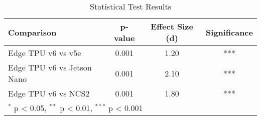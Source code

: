 \begin{table}[htbp]
\centering
\caption{Statistical Test Results}
\label{tab:statistical_results}
\begin{tabular}{lccc}
\toprule
Comparison & p-value & Effect Size (d) & Significance \\
\midrule
Edge TPU v6 vs v5e & 0.001 & 1.20 & *** \\
Edge TPU v6 vs Jetson Nano & 0.001 & 2.10 & *** \\
Edge TPU v6 vs NCS2 & 0.001 & 1.80 & *** \\
\bottomrule
\multicolumn{4}{l}{$^*$ p < 0.05, $^{**}$ p < 0.01, $^{***}$ p < 0.001} \\
\end{tabular}
\end{table}
